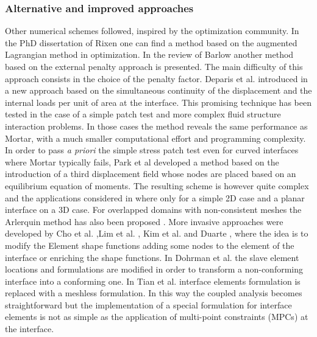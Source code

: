 \subsubsection{Alternative and improved approaches}
 Other numerical schemes followed, inspired by the optimization community. In the PhD dissertation of Rixen \cite{rixen1997substructuring} one can find a method based on the augmented Lagrangian method in optimization. In the review of  Barlow \cite{barlow1982constraint} another method based on the external penalty approach is presented. 
 The main difficulty of this approach consists in the choice of the penalty factor. 
 Deparis et al. introduced in \cite{deparis2016internodes} a new approach based on the simultaneous continuity of the displacement and the internal loads per unit of area at the interface. This promising technique has been tested in the case of a simple patch test and more complex fluid structure interaction problems. In those cases the method reveals the same performance as Mortar, with a much smaller computational effort and programming complexity. 
 In order to pass \textit{\textit{\textit{a priori}}} the simple stress patch test even for curved interfaces where Mortar typically fails,  Park et al \cite{park2002simpl} developed a method  based on the introduction of a third displacement field whose nodes are placed based on an equilibrium equation of moments. The resulting scheme is however quite complex and the applications considered in \cite{park2002simpl} where only for a simple 2D case and a planar interface on a 3D case. 
 For overlapped domains with non-consistent meshes the Arlerquin method has also been proposed \cite{dhia2005arlequin,dhia2008multimodeling}.
 More invasive approaches were developed by Cho et al. \cite{cho2005improved,cho2006mls,cho2006mlsII},Lim et al. \cite{lim2007mls,lim2007variable} , Kim et al. \cite{kim2003interface} and Duarte \cite{duarte2008analysis}, where the idea is to modify the Element shape functions adding some nodes to the element of the interface or enriching the shape functions. In Dohrman et al. \cite{dohrmann2000method,dohrmann2000methods} the slave element locations and formulations are modified in order to transform a non-conforming interface into a conforming one.
 In Tian et al. \cite{tian2007non} interface elements formulation is replaced with a meshless formulation. 
 In this way the coupled analysis becomes straightforward  but the implementation of a special formulation for interface elements is not as simple as the application of multi-point constraints (MPCs) at the interface. 
